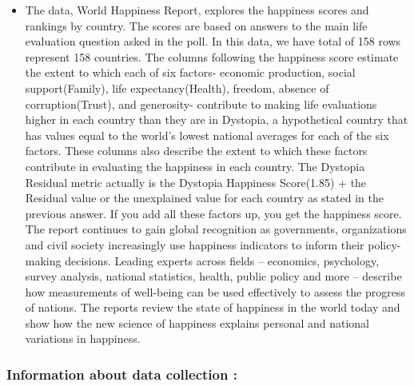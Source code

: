 \documentclass[11pt]{article}
\providecommand{\tightlist}{%
      \setlength{\itemsep}{0pt}\setlength{\parskip}{0pt}}
\begin{document}
\begin{itemize}
\tightlist
\item
  The data, World Happiness Report, explores the happiness scores and
  rankings by country. The scores are based on answers to the main life
  evaluation question asked in the poll. In this data, we have total of
  158 rows represent 158 countries. The columns following the happiness
  score estimate the extent to which each of six factors- economic
  production, social support(Family), life expectancy(Health), freedom,
  absence of corruption(Trust), and generosity- contribute to making
  life evaluations higher in each country than they are in Dystopia, a
  hypothetical country that has values equal to the world's lowest
  national averages for each of the six factors. These columns also
  describe the extent to which these factors contribute in evaluating
  the happiness in each country. The Dystopia Residual metric actually
  is the Dystopia Happiness Score(1.85) + the Residual value or the
  unexplained value for each country as stated in the previous answer.
  If you add all these factors up, you get the happiness score. The
  report continues to gain global recognition as governments,
  organizations and civil society increasingly use happiness indicators
  to inform their policy-making decisions. Leading experts across fields
  -- economics, psychology, survey analysis, national statistics,
  health, public policy and more -- describe how measurements of
  well-being can be used effectively to assess the progress of nations.
  The reports review the state of happiness in the world today and show
  how the new science of happiness explains personal and national
  variations in happiness.
\end{itemize}

\subsubsection{Information about data collection
:}\label{information-about-data-collection}
\end{document}
